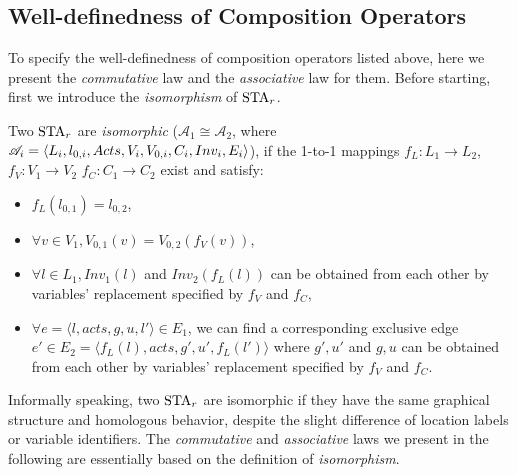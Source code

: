 % 
% 

\subsection{Well-definedness of Composition Operators}

To specify the well-definedness of composition operators listed above, here we present the \emph{commutative} law and the \emph{associative} law for them. Before starting, first we introduce the \emph{isomorphism} of $\mbox{STA}_r$.


\begin{definition}[Isomorphism]
    \label{def:isomorphism}
    Two $\mbox{STA}_r$ are \emph{isomorphic} ($\mathscr{A}_1\cong\mathscr{A}_2$, where $\mathscr{A}_{i}=\langle L_{i}, l_{0,i}, \textcolor{black}{Acts}, V_{i}, V_{0,i}, C_{i}, Inv_{i}, E_{i}\rangle$), if the 1-to-1 mappings $f_L:L_1\rightarrow L_2$, $f_V:V_1\rightarrow V_2$  $f_C:C_1\rightarrow C_2$
    exist and satisfy:
    \begin{itemize}
        \item $f_L(l_{0,1}) = l_{0,2}$, 
        \item $\forall v\in V_1, V_{0,1}(v) = V_{0,2}(f_V(v))$,
        \item $\forall l\in L_1, Inv_1(l)$ and $Inv_2(f_L(l))$ can be obtained from each other by variables' replacement specified by $f_V$ and $f_C$,
        \item $\forall e=\langle l, acts, g , u, l' \rangle \in E_1$, we can find a corresponding exclusive edge $e'\in E_2 = \langle f_L(l), acts, g', u', f_L(l')\rangle$
        where $g',u'$ and $g,u$ can be obtained from each other by variables' replacement specified by $f_V$ and $f_C$.
    \end{itemize}
\end{definition}

Informally speaking, two $\mbox{STA}_r$ are isomorphic if they have the same graphical structure and homologous behavior, despite the slight difference of location labels or variable identifiers. The \emph{commutative} and \emph{associative} laws we present in the following are essentially based on the definition of \emph{isomorphism}.


